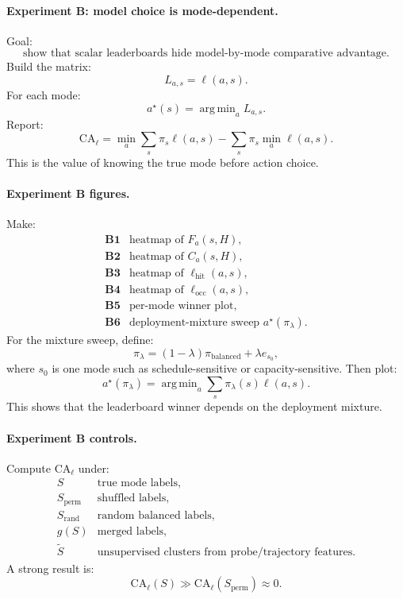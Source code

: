 \documentclass{article}
\DeclareMathOperator*{\argmin}{arg\,min}
\begin{document}
\paragraph{Experiment B: model choice is mode-dependent.}
Goal:
\[
    \text{show that scalar leaderboards hide model-by-mode comparative advantage.}
\]
Build the matrix:
\[
    L_{a,s}=\ell(a,s).
\]
For each mode:
\[
    a^\star(s)=\argmin_a L_{a,s}.
\]
Report:
\[
    \mathrm{CA}_{\ell}
    =
    \min_a\sum_s\pi_s\ell(a,s)
    -
    \sum_s\pi_s\min_a\ell(a,s).
\]
This is the value of knowing the true mode before action choice.

\paragraph{Experiment B figures.}
Make:
\[
\begin{array}{ll}
    \textbf{B1} & \text{heatmap of \(F_a(s,H)\)},\\
    \textbf{B2} & \text{heatmap of \(C_a(s,H)\)},\\
    \textbf{B3} & \text{heatmap of \(\ell_{\mathrm{hit}}(a,s)\)},\\
    \textbf{B4} & \text{heatmap of \(\ell_{\mathrm{occ}}(a,s)\)},\\
    \textbf{B5} & \text{per-mode winner plot},\\
    \textbf{B6} & \text{deployment-mixture sweep \(a^\star(\pi_\lambda)\)}.
\end{array}
\]
For the mixture sweep, define:
\[
    \pi_\lambda
    =
    (1-\lambda)\pi_{\mathrm{balanced}}
    +
    \lambda e_{s_0},
\]
where \(s_0\) is one mode such as schedule-sensitive or capacity-sensitive.
Then plot:
\[
    a^\star(\pi_\lambda)
    =
    \argmin_a\sum_s\pi_\lambda(s)\ell(a,s).
\]
This shows that the leaderboard winner depends on the deployment mixture.

\paragraph{Experiment B controls.}
Compute \(\mathrm{CA}_{\ell}\) under:
\[
\begin{array}{ll}
    S & \text{true mode labels},\\
    S_{\mathrm{perm}} & \text{shuffled labels},\\
    S_{\mathrm{rand}} & \text{random balanced labels},\\
    g(S) & \text{merged labels},\\
    \tilde S & \text{unsupervised clusters from probe/trajectory features}.
\end{array}
\]
A strong result is:
\[
    \mathrm{CA}_{\ell}(S)
    \gg
    \mathrm{CA}_{\ell}(S_{\mathrm{perm}})
    \approx
    0.
\]
\end{document}
